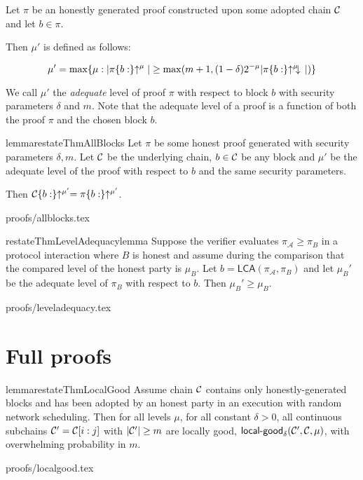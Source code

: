 \begin{definition}
Let $\pi$ be an honestly generated proof constructed upon some adopted chain
$\mathcal{C}$ and let $b \in \pi$.

Then $\mu'$ is defined as follows:

\begin{equation*}
\mu' = \max\{\mu: |\pi\{b:\}\negthickspace\uparrow^\mu| \geq \max(m + 1, (1 -
\delta)2^{-\mu}|\pi\{b:\}\negthickspace\uparrow^\mu\negthickspace\downarrow\,|)\}
\end{equation*}

We call $\mu'$ the \textit{adequate} level of proof $\pi$ with respect to
block $b$ with security parameters $\delta$ and $m$. Note that the adequate
level of a proof is a function of both the proof $\pi$ and the chosen block $b$.
\end{definition}

\begin{restatable}{lemma}{restateThmAllBlocks}\label{lem.allblocks}
Let $\pi$ be some honest proof generated with security parameters $\delta, m$.
Let $\mathcal{C}$ be the underlying chain, $b \in \mathcal{C}$ be any block and $\mu'$ be
the adequate level of the proof with respect to $b$ and the same security
parameters.

Then $\mathcal{C}\{b:\}\negthickspace\uparrow^{\mu'} = \pi\{b:\}\negthickspace\uparrow^{\mu'}$.
\end{restatable}
\ifonecolumn
{proofs/allblocks.tex}
\fi

\begin{restatable}{restateThmLevelAdequacy}{lemma}
Suppose the verifier evaluates $\pi_\mathcal{A} \geq \pi_B$ in a protocol
interaction where $B$ is honest and assume during the comparison that the
compared level of the honest party is $\mu_B$. Let $b =
\textsf{LCA}(\pi_\mathcal{A}, \pi_B)$ and let $\mu_B'$ be the adequate
level of $\pi_B$ with respect to $b$. Then $\mu_B' \geq \mu_B$.
\end{restatable}
\ifonecolumn
{proofs/leveladequacy.tex}
\fi


\section{Full proofs}
\label{sec.proofs}


\begin{restatable}{lemma}{restateThmLocalGood}
\label{lem.localgood}
Assume chain $\mathcal{C}$ contains only honestly-generated blocks and has been
adopted by an honest party in an execution with random network scheduling. Then
for all levels $\mu$, for all constant $\delta > 0$, all continuous subchains
$\mathcal{C}' = \mathcal{C}[i:j]$ with $|\mathcal{C}'| \geq m$ are locally good,
$\textsf{local-good}_{\delta}(\mathcal{C}', \mathcal{C}, \mu)$, with overwhelming
probability in $m$.
\end{restatable}
{proofs/localgood.tex}


